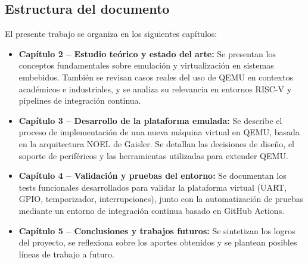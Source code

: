 \subsection*{Estructura del documento}

El presente trabajo se organiza en los siguientes capítulos:

\begin{itemize}
    \item \textbf{Capítulo 2 – Estudio teórico y estado del arte:} Se presentan los conceptos fundamentales sobre emulación y virtualización en sistemas embebidos. También se revisan casos reales del uso de QEMU en contextos académicos e industriales, y se analiza su relevancia en entornos RISC-V y pipelines de integración continua.

    \item \textbf{Capítulo 3 – Desarrollo de la plataforma emulada:} Se describe el proceso de implementación de una nueva máquina virtual en QEMU, basada en la arquitectura NOEL de Gaisler. Se detallan las decisiones de diseño, el soporte de periféricos y las herramientas utilizadas para extender QEMU.

    \item \textbf{Capítulo 4 – Validación y pruebas del entorno:} Se documentan los tests funcionales desarrollados para validar la plataforma virtual (UART, GPIO, temporizador, interrupciones), junto con la automatización de pruebas mediante un entorno de integración continua basado en GitHub Actions.

    \item \textbf{Capítulo 5 – Conclusiones y trabajos futuros:} Se sintetizan los logros del proyecto, se reflexiona sobre los aportes obtenidos y se plantean posibles líneas de trabajo a futuro.
\end{itemize}
